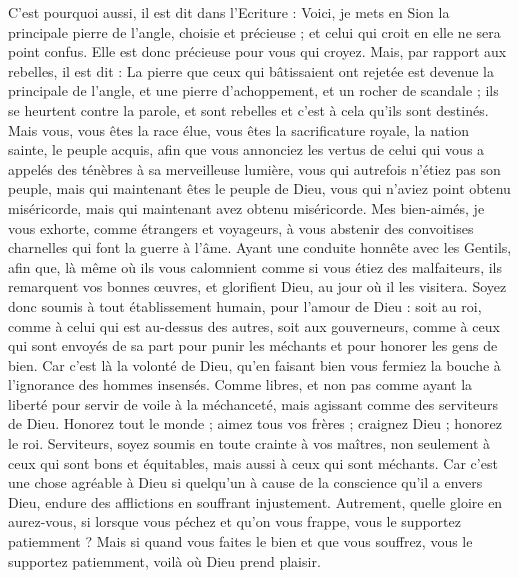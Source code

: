 \begin{multicols}{2}
C'est pourquoi aussi, il est dit dans l'Ecriture : Voici, je mets en Sion la principale pierre de l'angle, choisie et précieuse ; et celui qui croit en elle ne sera point confus.
Elle est donc précieuse pour vous qui croyez. Mais, par rapport aux rebelles, il est dit : La pierre que ceux qui bâtissaient ont rejetée est devenue la principale de l'angle, 
et une pierre d'achoppement, et un rocher de scandale ; ils se heurtent contre la parole, et sont rebelles et c'est à cela qu'ils sont destinés.
Mais vous, vous êtes la race élue, vous êtes la sacrificature royale, la nation sainte, le peuple acquis, afin que vous annonciez les vertus de celui qui vous a appelés des ténèbres à sa merveilleuse lumière,
vous qui autrefois n'étiez pas son peuple, mais qui maintenant êtes le peuple de Dieu, vous qui n'aviez point obtenu miséricorde, mais qui maintenant avez obtenu miséricorde.
Mes bien-aimés, je vous exhorte, comme étrangers et voyageurs, à vous abstenir des convoitises charnelles qui font la guerre à l'âme.
Ayant une conduite honnête avec les Gentils, afin que, là même où ils vous calomnient comme si vous étiez des malfaiteurs, ils remarquent vos bonnes œuvres, et glorifient Dieu, au jour où il les visitera.
Soyez donc soumis à tout établissement humain, pour l'amour de Dieu : soit au roi, comme à celui qui est au-dessus des autres,
soit aux gouverneurs, comme à ceux qui sont envoyés de sa part pour punir les méchants et pour honorer les gens de bien.
Car c'est là la volonté de Dieu, qu'en faisant bien vous fermiez la bouche à l'ignorance des hommes insensés.
Comme libres, et non pas comme ayant la liberté pour servir de voile à la méchanceté, mais agissant comme des serviteurs de Dieu.
Honorez tout le monde ; aimez tous vos frères ; craignez Dieu ; honorez le roi.
Serviteurs, soyez soumis en toute crainte à vos maîtres, non seulement à ceux qui sont bons et équitables, mais aussi à ceux qui sont méchants.
Car c'est une chose agréable à Dieu si quelqu'un à cause de la conscience qu'il a envers Dieu, endure des afflictions en souffrant injustement. 
Autrement, quelle gloire en aurez-vous, si lorsque vous péchez et qu’on vous frappe, vous le supportez  patiemment ? Mais si quand vous faites le bien et que vous souffrez, vous le supportez patiemment, voilà où Dieu prend plaisir. 

\end{multicols}
